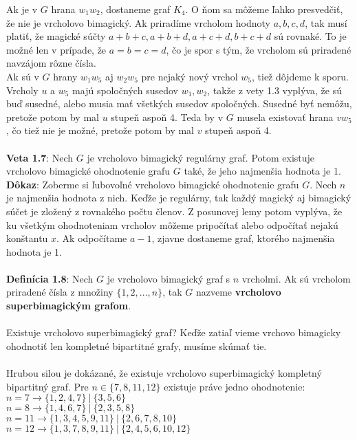 \documentclass[12pt]{article}
\begin{document}
Ak je v $G$ hrana $w_1 w_2$, dostaneme graf $K_4$. O ňom sa môžeme ľahko presvedčiť, že nie je vrcholovo bimagický. Ak priradíme vrcholom hodnoty $a,b,c,d$, tak musí platiť, že magické súčty $a+b+c, a+b+d, a+c+d, b+c+d$ sú rovnaké. To je možné len v prípade, že $a = b = c = d$, čo je spor s tým, že vrcholom sú priradené navzájom rôzne čísla. \\

Ak sú v $G$ hrany $w_1 w_5$ aj $w_2 w_5$ pre nejaký nový vrchol $w_5$, tiež dôjdeme k sporu. Vrcholy $u$ a $w_5$ majú spoločných susedov $w_1, w_2$, takže z vety 1.3 vyplýva, že sú buď susedné, alebo musia mať všetkých susedov spoločných. Susedné byť nemôžu, pretože potom by mal $u$ stupeň aspoň 4. Teda by v $G$ musela existovať hrana $v w_5$, čo tiež nie je možné, pretože potom by mal $v$ stupeň aspoň 4. \\\\

\textbf{Veta 1.7}: Nech $G$ je vrcholovo bimagický regulárny graf. Potom existuje vrcholovo bimagické ohodnotenie grafu $G$ také, že jeho najmenšia hodnota je 1. \\

\textbf{Dôkaz}: Zoberme si ľubovoľné vrcholovo bimagické ohodnotenie grafu $G$. Nech $n$ je najmenšia hodnota z nich. Keďže je regulárny, tak každý magický aj bimagický súčet je zložený z rovnakého počtu členov. Z posunovej lemy potom vyplýva, že ku všetkým ohodnoteniam vrcholov môžeme pripočítať alebo odpočítať nejakú konštantu $x$. Ak odpočítame $a-1$, zjavne dostaneme graf, ktorého najmenšia hodnota je 1. \\\\

\textbf{Definícia 1.8}: Nech $G$ je vrcholovo bimagický graf s $n$ vrcholmi. Ak sú vrcholom priradené čísla z množiny $\{1, 2, ... , n\}$, tak $G$ nazveme \textbf{ vrcholovo superbimagickým grafom}. \\\\

Existuje vrcholovo superbimagický graf? Keďže zatiaľ vieme vrchovo bimagicky ohodnotiť len kompletné bipartitné grafy, musíme skúmať tie. \\\\

Hrubou silou je dokázané, že existuje vrcholovo superbimagický kompletný bipartitný graf. Pre $n \in \{7, 8, 11, 12\}$ existuje práve jedno ohodnotenie: \\
$n = 7 \rightarrow \{1, 2, 4, 7\} ~|~ \{3, 5, 6\}$ \\
$n = 8 \rightarrow \{1, 4, 6, 7\} ~|~ \{2, 3, 5, 8\}$ \\
$n = 11 \rightarrow \{1, 3, 4, 5, 9, 11\} ~|~ \{2, 6, 7, 8, 10\}$ \\
$n = 12 \rightarrow \{1, 3, 7, 8, 9, 11\} ~|~ \{2, 4, 5, 6, 10, 12\}$ \\\\
\end{document}
